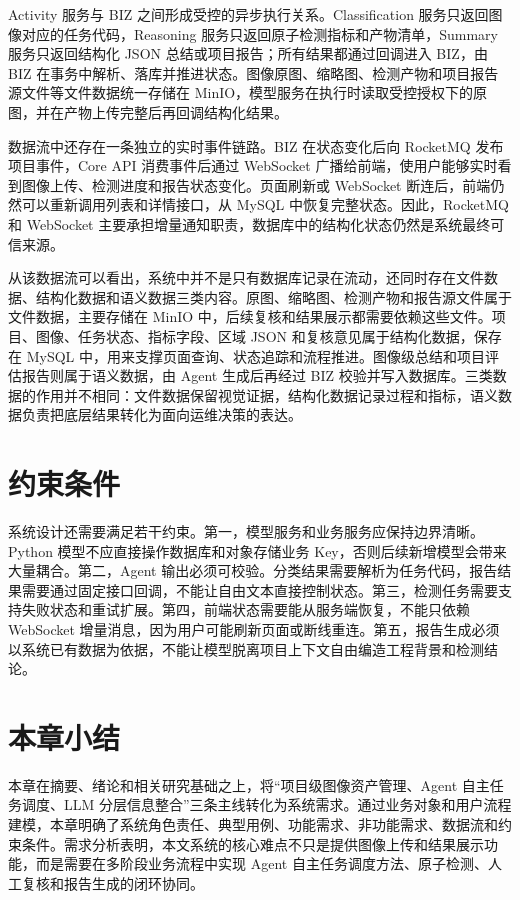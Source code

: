 Activity 服务与 BIZ 之间形成受控的异步执行关系。Classification 服务只返回图像对应的任务代码，Reasoning 服务只返回原子检测指标和产物清单，Summary 服务只返回结构化 JSON 总结或项目报告；所有结果都通过回调进入 BIZ，由 BIZ 在事务中解析、落库并推进状态。图像原图、缩略图、检测产物和项目报告源文件等文件数据统一存储在 MinIO，模型服务在执行时读取受控授权下的原图，并在产物上传完整后再回调结构化结果。

数据流中还存在一条独立的实时事件链路。BIZ 在状态变化后向 RocketMQ 发布项目事件，Core API 消费事件后通过 WebSocket 广播给前端，使用户能够实时看到图像上传、检测进度和报告状态变化。页面刷新或 WebSocket 断连后，前端仍然可以重新调用列表和详情接口，从 MySQL 中恢复完整状态。因此，RocketMQ 和 WebSocket 主要承担增量通知职责，数据库中的结构化状态仍然是系统最终可信来源。

从该数据流可以看出，系统中并不是只有数据库记录在流动，还同时存在文件数据、结构化数据和语义数据三类内容。原图、缩略图、检测产物和报告源文件属于文件数据，主要存储在 MinIO 中，后续复核和结果展示都需要依赖这些文件。项目、图像、任务状态、指标字段、区域 JSON 和复核意见属于结构化数据，保存在 MySQL 中，用来支撑页面查询、状态追踪和流程推进。图像级总结和项目评估报告则属于语义数据，由 Agent 生成后再经过 BIZ 校验并写入数据库。三类数据的作用并不相同：文件数据保留视觉证据，结构化数据记录过程和指标，语义数据负责把底层结果转化为面向运维决策的表达。

\section{约束条件}
\label{sec:requirements-constraints}

系统设计还需要满足若干约束。第一，模型服务和业务服务应保持边界清晰。Python 模型不应直接操作数据库和对象存储业务 Key，否则后续新增模型会带来大量耦合。第二，Agent 输出必须可校验。分类结果需要解析为任务代码，报告结果需要通过固定接口回调，不能让自由文本直接控制状态。第三，检测任务需要支持失败状态和重试扩展。第四，前端状态需要能从服务端恢复，不能只依赖 WebSocket 增量消息，因为用户可能刷新页面或断线重连。第五，报告生成必须以系统已有数据为依据，不能让模型脱离项目上下文自由编造工程背景和检测结论。

\section{本章小结}
\label{sec:requirements-chapter-summary}

本章在摘要、绪论和相关研究基础之上，将“项目级图像资产管理、Agent 自主任务调度、LLM 分层信息整合”三条主线转化为系统需求。通过业务对象和用户流程建模，本章明确了系统角色责任、典型用例、功能需求、非功能需求、数据流和约束条件。需求分析表明，本文系统的核心难点不只是提供图像上传和结果展示功能，而是需要在多阶段业务流程中实现 Agent 自主任务调度方法、原子检测、人工复核和报告生成的闭环协同。


